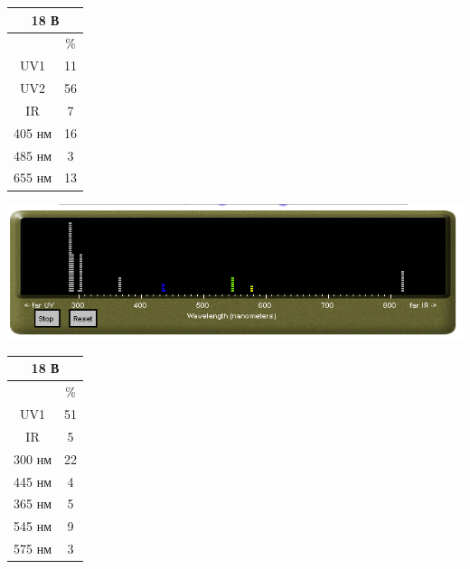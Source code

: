 \documentclass[a4paper,14pt]{extreport}
\begin{document}
	\begin{center}
		\begin{tabular}{|c|c|}
		\hline
		\multicolumn{2}{|c|}{18 В}                              \\ \hline
		                             & \%                       \\ \hline
		UV1                          & 11                   \\ \hline
		UV2                          & 56                   \\ \hline
		IR                           & 7                     \\ \hline
		405 нм                       & 16                      \\ \hline
		485 нм                       & 3                      \\ \hline
		655 нм                       & 13						\\ \hline
		\end{tabular}
	\end{center}








\begin{center}


		\includegraphics[width=0.7\linewidth]{2.png}\end{center}

	\begin{center}
		\begin{tabular}{|c|c|}
		\hline
		\multicolumn{2}{|c|}{18 В}                              \\ \hline
		                             & \%                       \\ \hline
		UV1                          & 51                   \\ \hline
		IR                           & 5                     \\ \hline
		300 нм                       & 22                      \\ \hline
		445 нм                       & 4                      \\ \hline
		365 нм                       & 5                      \\ \hline
		545 нм                       & 9                      \\ \hline
		575 нм                       & 3						\\ \hline
		\end{tabular}
	\end{center}
\end{document}
